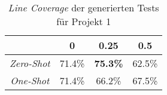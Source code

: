 \bgroup
\def\arraystretch{2}
\begin{table}[H]
	\vspace{.5cm}
	\centering		
	\begin{center}
		\begin{tabular}{|c||c|c|c|}
			\hline 
			& 0 & 0.25 & 0.5 \\
			\hline 
			\hline
			\textit{Zero-Shot} & 71.4\% & \textbf{75.3\%} & 62.5\% \\
			\hline
			\textit{One-Shot} & 71.4\% & 66.2\% & 67.5\% \\
			\hline
		\end{tabular} 
	\end{center}
	\caption{\textit{Line Coverage} der generierten Tests für Projekt 1}
	\label{fig:line-1}
	\vspace{-.8cm}
\end{table}
\egroup
